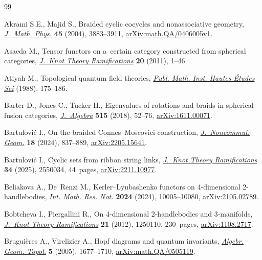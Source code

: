 \begin{thebibliography}{99}
\footnotesize\itemsep=0pt

Akrami S.E., Majid S., Braided cyclic cocycles and nonassociative geometry,
 \href{https://doi.org/10.1063/1.1787621}{\textit{J.~Math. Phys.}} \textbf{45}
 (2004), 3883--3911,
 \href{http://arxiv.org/abs/math.QA/0406005v1}{arXiv:math.QA/0406005v1}.

Asaeda M., Tensor functors on a~certain category constructed from spherical
 categories, \href{https://doi.org/10.1142/S0218216511008607}{\textit{J.~Knot
 Theory Ramifications}} \textbf{20} (2011), 1--46.

Atiyah M., Topological quantum field theories,
 \href{https://doi.org/10.1007/BF02698547}{\textit{Publ. Math. Inst. Hautes
 \'Etudes Sci}} (1988), 175--186.

Barter D., Jones C., Tucker H., Eigenvalues of rotations and braids in
 spherical fusion categories,
 \href{https://doi.org/10.1016/j.jalgebra.2018.08.011}{\textit{J.~Algebra}}
 \textbf{515} (2018), 52--76,
 \href{http://arxiv.org/abs/1611.00071}{arXiv:1611.00071}.

Bartulovi\'c I., On the braided {C}onnes--{M}oscovici construction,
 \href{https://doi.org/10.4171/jncg/541}{\textit{J.~Noncommut. Geom.}}
 \textbf{18} (2024), 837--889,
 \href{http://arxiv.org/abs/2205.15641}{arXiv:2205.15641}.

Bartulovi\'c I., Cyclic sets from ribbon string links,
 \href{https://doi.org/10.1142/S0218216525500348}{\textit{J.~Knot Theory
 Ramifications}} \textbf{34} (2025), 2550034, 44~pages,
 \href{http://arxiv.org/abs/2211.10977}{arXiv:2211.10977}.

Beliakova A., De~Renzi M., Kerler--{L}yubashenko functors on 4-dimensional
 2-handlebodies, \href{https://doi.org/10.1093/imrn/rnac039}{\textit{Int.
 Math. Res. Not.}} \textbf{2024} (2024), 10005--10080,
 \href{http://arxiv.org/abs/2105.02789}{arXiv:2105.02789}.

Bobtcheva I., Piergallini R., On 4-dimensional 2-handlebodies and 3-manifolds,
 \href{https://doi.org/10.1142/S0218216512501106}{\textit{J.~Knot Theory
 Ramifications}} \textbf{21} (2012), 1250110, 230~pages,
 \href{http://arxiv.org/abs/1108.2717}{arXiv:1108.2717}.

Brugui\`eres A., Virelizier A., Hopf diagrams and quantum invariants,
 \href{https://doi.org/10.2140/agt.2005.5.1677}{\textit{Algebr. Geom. Topol.}}
 \textbf{5} (2005), 1677--1710,
 \href{http://arxiv.org/abs/math.QA/0505119}{arXiv:math.QA/0505119}.


\end{thebibliography}
